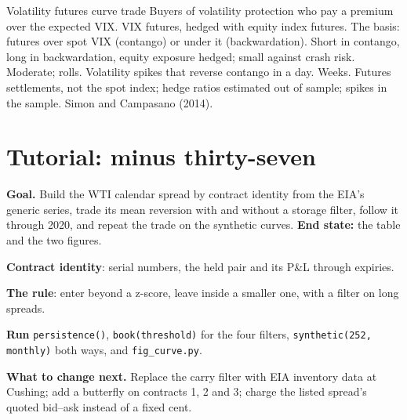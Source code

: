 \begin{strategyfile}{Volatility futures curve trade}\label{strat:s1:calendar-spreads-and-curve-trades:vix}
 Buyers of volatility protection who pay a premium over the expected VIX.
 VIX futures, hedged with equity index futures.
 The basis: futures over spot VIX (contango) or under it (backwardation).
 Short in contango, long in backwardation, equity exposure hedged; small against crash risk.
 Moderate; rolls.
 Volatility spikes that reverse contango in a day.
 Weeks.
 Futures settlements, not the spot index; hedge ratios estimated out of sample; spikes in the sample.
 Simon and Campasano (2014).
\end{strategyfile}

\section{Tutorial: minus thirty-seven}\label{tut:s1:calendar-spreads-and-curve-trades:tut}

\begin{tutorial}
\textbf{Goal.} Build the WTI calendar spread by contract identity from the EIA's generic series, trade its mean reversion with and without a storage
filter, follow it through 2020, and repeat the trade on the synthetic curves. \textbf{End state:} the table and the two figures.
\begin{tutsteps}
\item \textbf{Contract identity}: serial numbers, the held pair and its P\&L through expiries.
\label{lst:s1:calendar-spreads-and-curve-trades:pair}
\item \textbf{The rule}: enter beyond a z-score, leave inside a smaller one, with a filter on long spreads.
\label{lst:s1:calendar-spreads-and-curve-trades:band}
\item \textbf{Run} \texttt{persistence()}, \texttt{book(threshold)} for the four filters, \texttt{synthetic(252, monthly)} both ways, and
\texttt{fig\_curve.py}.
\end{tutsteps}
\textbf{What to change next.} Replace the carry filter with EIA inventory data at Cushing; add a butterfly on contracts 1, 2 and 3; charge the listed
spread's quoted bid--ask instead of a fixed cent.
\end{tutorial}

